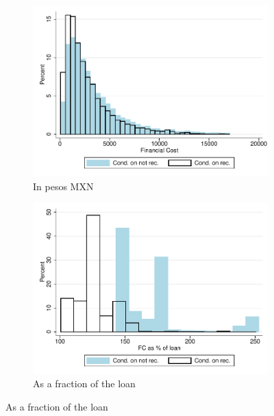 \documentclass[oneside,11pt]{article}
\begin{document}
\vspace{.2in}
\begin{figure}[H]
     \caption{Financial cost}
    \label{fc_hist}
    \begin{center}
    \begin{subfigure}{.45\textwidth}
      \caption{In pesos MXN}
        \centering
        \includegraphics[width=\textwidth]{Figuras/hist_fc.pdf}
    \end{subfigure}
    \begin{subfigure}{0.45\textwidth}
    \caption{As a fraction of the loan}
       \centering
      \includegraphics[width=\textwidth]{Figuras/hist_fc_perc_loan.pdf}
    \end{subfigure}
    \end{center}

\end{figure}
\end{document}
